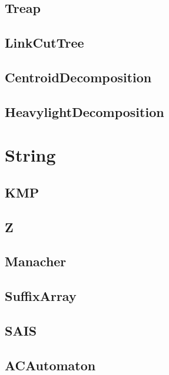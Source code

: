 \subsection{Treap}

\subsection{LinkCutTree}

\subsection{CentroidDecomposition}

\subsection{HeavylightDecomposition}

\section{String}
\subsection{KMP}

\subsection{Z}

\subsection{Manacher}

\subsection{SuffixArray}

\subsection{SAIS}

\subsection{ACAutomaton}


